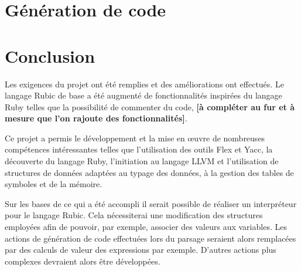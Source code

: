\documentclass[12pt]{article}
\begin{document}
\section{Génération de code}

\section{Conclusion}

Les exigences du projet ont été remplies et des améliorations ont effectués.
Le langage Rubic de base a été augmenté de fonctionnalités inspirées du
langage Ruby telles que la possibilité de commenter du code, \textbf{[à compléter au
fur et à mesure que l'on rajoute des fonctionnalités]}.

Ce projet a permis le développement et la mise en œuvre de nombreuses
compétences intéressantes telles que l'utilisation des outils Flex et Yacc, la
découverte du langage Ruby, l'initiation au langage LLVM et l'utilisation de
structures de données adaptées au typage des données, à la gestion des tables
de symboles et de la mémoire.

Sur les bases de ce qui a été accompli il serait possible de réaliser un
interpréteur pour le langage Rubic. Cela nécessiterai une modification des
structures employées afin de pouvoir, par exemple, associer des valeurs aux
variables. Les actions de génération de code effectuées lors du parsage
seraient alors remplacées par des calculs de valeur des expressions par
exemple. D'autres actions plus complexes devraient alors être développées.
\end{document}
